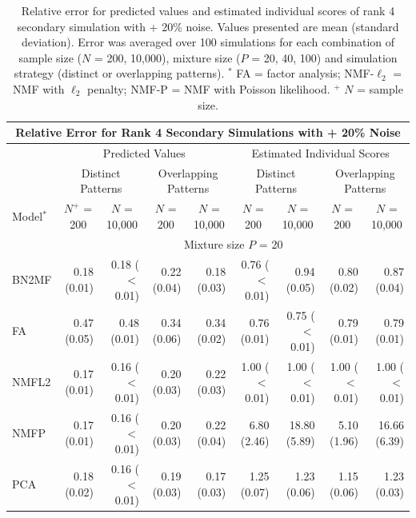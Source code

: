 \endgroup

\clearpage
\begin{landscape}
\begingroup
\renewcommand{\arraystretch}{1.2}
\begin{table}[!htbp] \centering 
  \caption{Relative error for predicted values and estimated individual scores of rank 4 secondary simulation with + 20\% noise. Values presented are mean (standard deviation). Error was averaged over 100 simulations for each combination of sample size ($N$ = 200, 10,000), mixture size ($P$ = 20, 40, 100) and simulation strategy (distinct or overlapping patterns). $^*$ FA = factor analysis; NMF-$\ell_2$ = NMF with $\ell_2$ penalty; NMF-P = NMF with Poisson likelihood. $^+$ $N$ = sample size.}
  \label{table:sup4} 
 \addtolength{\tabcolsep}{-2pt}
\small
\begin{tabular}{lrr|rr|rr|rr}
\multicolumn{9}{c}{Relative Error for Rank 4 Secondary Simulations with + 20\% Noise} \\
\hline 
\hline  
& \multicolumn{4}{c}{Predicted Values} & \multicolumn{4}{c}{Estimated Individual Scores} \\
\hline
\hline
& \multicolumn{2}{c}{Distinct Patterns} & \multicolumn{2}{c}{Overlapping Patterns} & \multicolumn{2}{c}{Distinct Patterns} & \multicolumn{2}{c}{Overlapping Patterns} \\
\hline
\hline  
Model$^*$ & \multicolumn{1}{c}{$N^+$ = 200} & \multicolumn{1}{c}{$N$ = 10,000} & \multicolumn{1}{c}{$N$ = 200} & \multicolumn{1}{c}{$N$ = 10,000} & \multicolumn{1}{c}{$N$ = 200} & \multicolumn{1}{c}{$N$ = 10,000} & \multicolumn{1}{c}{$N$ = 200} & \multicolumn{1}{c}{$N$ = 10,000} \\
\hline
\hline  
& \multicolumn{8}{c}{Mixture size $P$ = 20} \\
\hline
BN2MF & 0.18 (0.01) & 0.18 ($<$0.01) & 0.22 (0.04) & 0.18 (0.03) & 0.76 ($<$0.01) & 0.94 (0.05) & 0.80 (0.02) & 0.87 (0.04) \\ 
FA & 0.47 (0.05) & 0.48 (0.01) & 0.34 (0.06) & 0.34 (0.02) & 0.76 (0.01) & 0.75 ($<$0.01) & 0.79 (0.01) & 0.79 (0.01) \\ 
NMFL2 & 0.17 (0.01) & 0.16 ($<$0.01) & 0.20 (0.03) & 0.22 (0.03) & 1.00 ($<$0.01) & 1.00 ($<$0.01) & 1.00 ($<$0.01) & 1.00 ($<$0.01) \\ 
NMFP & 0.17 (0.01) & 0.16 ($<$0.01) & 0.20 (0.03) & 0.22 (0.04) & 6.80 (2.46) & 18.80 (5.89) & 5.10 (1.96) & 16.66 (6.39) \\ 
PCA & 0.18 (0.02) & 0.16 ($<$0.01) & 0.19 (0.03) & 0.17 (0.03) & 1.25 (0.07) & 1.23 (0.06) & 1.15 (0.06) & 1.23 (0.03) \\ 

\end{tabular}
\end{table}
\end{landscape}
